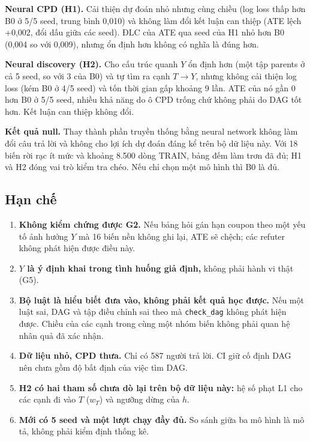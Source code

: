 \documentclass[pdflatex,sn-mathphys-num]{sn-jnl}%
\begin{document}
\textbf{Neural CPD (H1).} Cải thiện dự đoán nhỏ nhưng cùng chiều (log loss thấp hơn B0 ở 5/5 seed, trung bình 0,010) và không làm đổi kết luận can thiệp (ATE lệch +0,002, đổi dấu giữa các seed). ĐLC của ATE qua seed của H1 nhỏ hơn B0 (0,004 so với 0,009), nhưng ổn định hơn không có nghĩa là đúng hơn.

\textbf{Neural discovery (H2).} Cho cấu trúc quanh $Y$ ổn định hơn (một tập parents ở cả 5 seed, so với 3 của B0) và tự tìm ra cạnh $T \to Y$, nhưng không cải thiện log loss (kém B0 ở 4/5 seed) và tốn thời gian gấp khoảng 9 lần. ATE của nó gần 0 hơn B0 ở 5/5 seed, nhiều khả năng do ô CPD trống chứ không phải do DAG tốt hơn. Kết luận can thiệp không đổi.

\textbf{Kết quả null.} Thay thành phần truyền thống bằng neural network không làm đổi câu trả lời và không cho lợi ích dự đoán đáng kể trên bộ dữ liệu này. Với 18 biến rời rạc ít mức và khoảng 8.500 dòng TRAIN, bảng đếm làm trơn đã đủ; H1 và H2 đóng vai trò kiểm tra chéo. Nếu chỉ chọn một mô hình thì B0 là đủ.

\subsection{Hạn chế}\label{sec:limits}

\begin{enumerate}
\item \textbf{Không kiểm chứng được G2.} Nếu bảng hỏi gán hạn coupon theo một yếu tố ảnh hưởng $Y$ mà 16 biến nền không ghi lại, ATE sẽ chệch; các refuter không phát hiện được điều này.
\item \textbf{$Y$ là ý định khai trong tình huống giả định,} không phải hành vi thật (G5).
\item \textbf{Bộ luật là hiểu biết đưa vào, không phải kết quả học được.} Nếu một luật sai, DAG và tập điều chỉnh sai theo mà \texttt{check\_dag} không phát hiện được. Chiều của các cạnh trong cùng một nhóm biến không phải quan hệ nhân quả đã xác nhận.
\item \textbf{Dữ liệu nhỏ, CPD thưa.} Chỉ có 587 người trả lời. CI giữ cố định DAG nên chưa gồm độ bất định của việc tìm DAG.
\item \textbf{H2 có hai tham số chưa dò lại trên bộ dữ liệu này:} hệ số phạt L1 cho các cạnh đi vào $T$ ($w_T$) và ngưỡng dừng của $h$.
\item \textbf{Mới có 5 seed và một lượt chạy đầy đủ.} So sánh giữa ba mô hình là mô tả, không phải kiểm định thống kê.
\end{enumerate}
\end{document}
